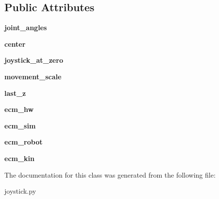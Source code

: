 \subsection*{Public Attributes}
\begin{DoxyCompactItemize}
\item 
\hypertarget{classjoystick_1_1Joystick_a90f93349791a015725873f595d41b76a}{{\bfseries joint\-\_\-angles}}\label{classjoystick_1_1Joystick_a90f93349791a015725873f595d41b76a}

\item 
\hypertarget{classjoystick_1_1Joystick_af68af8c1391522280fddd6089c6a0b43}{{\bfseries center}}\label{classjoystick_1_1Joystick_af68af8c1391522280fddd6089c6a0b43}

\item 
\hypertarget{classjoystick_1_1Joystick_a82bf14720133a3294020554347bf1f5a}{{\bfseries joystick\-\_\-at\-\_\-zero}}\label{classjoystick_1_1Joystick_a82bf14720133a3294020554347bf1f5a}

\item 
\hypertarget{classjoystick_1_1Joystick_a5eaa063fe5b8c7afb634165a0380534b}{{\bfseries movement\-\_\-scale}}\label{classjoystick_1_1Joystick_a5eaa063fe5b8c7afb634165a0380534b}

\item 
\hypertarget{classjoystick_1_1Joystick_a4ecd0948bda8c8154b9ae37de92f24b4}{{\bfseries last\-\_\-z}}\label{classjoystick_1_1Joystick_a4ecd0948bda8c8154b9ae37de92f24b4}

\item 
\hypertarget{classjoystick_1_1Joystick_a38de7a8c2a5b76976462666bc15c3182}{{\bfseries ecm\-\_\-hw}}\label{classjoystick_1_1Joystick_a38de7a8c2a5b76976462666bc15c3182}

\item 
\hypertarget{classjoystick_1_1Joystick_a7892d4ac35c98d63a1bd1187b071eecb}{{\bfseries ecm\-\_\-sim}}\label{classjoystick_1_1Joystick_a7892d4ac35c98d63a1bd1187b071eecb}

\item 
\hypertarget{classjoystick_1_1Joystick_afb2f76d862615a983a9d9d208e83cbb9}{{\bfseries ecm\-\_\-robot}}\label{classjoystick_1_1Joystick_afb2f76d862615a983a9d9d208e83cbb9}

\item 
\hypertarget{classjoystick_1_1Joystick_a842aa6758b92b526ea3d213ea96fb3f0}{{\bfseries ecm\-\_\-kin}}\label{classjoystick_1_1Joystick_a842aa6758b92b526ea3d213ea96fb3f0}

\end{DoxyCompactItemize}


The documentation for this class was generated from the following file\-:\begin{DoxyCompactItemize}
\item 
joystick.\-py\end{DoxyCompactItemize}
